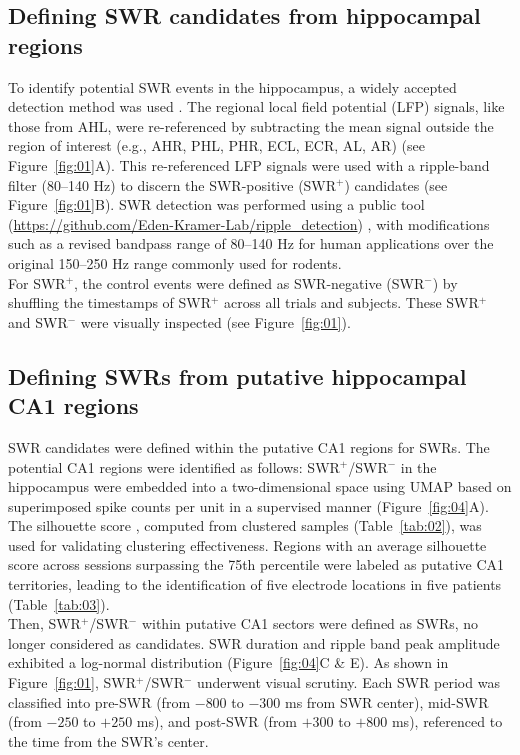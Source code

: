 \subsection{Defining SWR candidates from hippocampal regions}
To identify potential SWR events in the hippocampus, a widely accepted detection method was used \cite{liu_consensus_2022}. The regional local field potential (LFP) signals, like those from AHL, were re-referenced by subtracting the mean signal outside the region of interest (e.g., AHR, PHL, PHR, ECL, ECR, AL, AR) (see Figure~\ref{fig:01}A). This re-referenced LFP signals were used with a ripple-band filter (80--140 Hz) to discern the SWR-positive (SWR$^+$) candidates (see Figure~\ref{fig:01}B). SWR detection was performed using a public tool (\url{https://github.com/Eden-Kramer-Lab/ripple_detection}) \cite{kay_hippocampal_2016}, with modifications such as a revised bandpass range of 80--140 Hz for human applications \cite{norman_hippocampal_2019,norman_hippocampal_2021} over the original 150--250 Hz range commonly used for rodents.
\\
\indent
For SWR$^+$, the control events were defined as SWR-negative (SWR$^-$) by shuffling the timestamps of SWR$^+$ across all trials and subjects. These SWR$^+$ and SWR$^-$  were visually inspected (see Figure~\ref{fig:01}).

\subsection{Defining SWRs from putative hippocampal CA1 regions}
SWR candidates were defined within the putative CA1 regions for SWRs. The potential CA1 regions were identified as follows: SWR$^+$/SWR$^-$ in the hippocampus were embedded into a two-dimensional space using UMAP based on superimposed spike counts per unit in a supervised manner \cite{mcinnes_umap_2018}(Figure~\ref{fig:04}A). The silhouette score \cite{rousseeuw_silhouettes_1987}, computed from clustered samples (Table~\ref{tab:02}), was used for validating clustering effectiveness. Regions with an average silhouette score across sessions surpassing the 75th percentile were labeled as putative CA1 territories, leading to the identification of five electrode locations in five patients (Table~\ref{tab:03}).
\\
\indent
Then, SWR$^+$/SWR$^-$ within putative CA1 sectors were defined as SWRs, no longer considered as candidates. SWR duration and ripple band peak amplitude exhibited a log-normal distribution (Figure~\ref{fig:04}C \& E). As shown in Figure~\ref{fig:01}, SWR$^+$/SWR$^-$ underwent visual scrutiny. Each SWR period was classified into pre-SWR (from $-800$ to $-300$ ms from SWR center), mid-SWR (from $-250$ to $+250$ ms), and post-SWR (from $+300$ to $+800$ ms), referenced to the time from the SWR's center.

